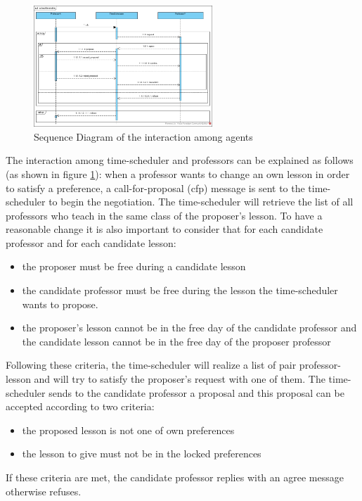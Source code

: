 \begin{figure}[h]
    \centering
    \includegraphics[width=0.60\textwidth]{images/sequence_diagram.jpg}
    \caption{Sequence Diagram of the interaction among agents}
    \label{fig:seq_diagram}
\end{figure}
The interaction among time-scheduler and professors can be explained as follows (as shown in figure \ref{fig:seq_diagram}):\newline
when a professor wants to change an own lesson in order to satisfy a preference, a call-for-proposal (cfp) message is sent to the time-scheduler to begin the negotiation.
The time-scheduler will retrieve the list of all professors who teach in the same class of the proposer's lesson. To have a reasonable change it is also important to consider that for each candidate professor and for each candidate lesson:
\begin{itemize}
    \item the proposer must be free during a candidate lesson
    \item the candidate professor must be free during the lesson the time-scheduler wants to propose.
    \item the proposer's lesson cannot be in the free day of the candidate professor and the candidate lesson cannot be in the free day of the proposer professor
\end{itemize}
Following these criteria, the time-scheduler will realize a list of pair professor-lesson and will try to satisfy the proposer's request with one of them.
The time-scheduler sends to the candidate professor a proposal and this proposal can be accepted according to two criteria:
\begin{itemize}
    \item the proposed lesson is not one of own preferences
    \item the lesson to give must not be in the locked preferences
\end{itemize}
If these criteria are met, the candidate professor replies with an agree message otherwise refuses.
